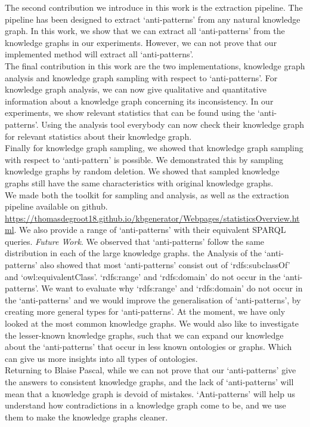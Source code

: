 \documentclass[11pt,letterpaper ,oneside ]{book}
\begin{document}
The second contribution we introduce in this work is the extraction pipeline. The pipeline has been designed to extract `anti-patterns' from any natural knowledge graph. In this work, we show that we can extract all `anti-patterns' from the knowledge graphs in our experiments. However, we can not prove that our implemented method will extract all `anti-patterns'.\\ 

The final contribution in this work are the two implementations, knowledge graph analysis and knowledge graph sampling with respect to `anti-patterns'. For knowledge graph analysis, we can now give qualitative and quantitative information about a knowledge graph concerning its inconsistency. In our experiments, we show relevant statistics that can be found using the `anti-patterns'. Using the analysis tool everybody can now check their knowledge graph for relevant statistics about their knowledge graph. \\

Finally for knowledge graph sampling, we showed that knowledge graph sampling with respect to `anti-pattern' is possible. We demonstrated this by sampling knowledge graphs by random deletion. We showed that sampled knowledge graphs still have the same characteristics with original knowledge graphs.\\

We made both the toolkit for sampling and analysis, as well as the extraction pipeline available on github. \\ \url{https://thomasdegroot18.github.io/kbgenerator/Webpages/statisticsOverview.html}. We also provide a range of `anti-patterns' with their equivalent SPARQL queries.
\textit{Future Work}. We observed that `anti-patterns' follow the same distribution in each of the large knowledge graphs. the Analysis of the `anti-patterns' also showed that most `anti-patterns' consist out of `rdfs:subclassOf' and `owl:equivalentClass'. `rdfs:range' and `rdfs:domain' do not occur in the `anti-patterns'.
We want to evaluate why `rdfs:range' and `rdfs:domain' do not occur in the `anti-patterns' and we would improve the generalisation of `anti-patterns', by creating more general types for `anti-patterns'. At the moment, we have only looked at the most common knowledge graphs. We would also like to investigate the lesser-known knowledge graphs, such that we can expand our knowledge about the `anti-patterns' that occur in less known ontologies or graphs. Which can give us more insights into all types of ontologies.\\

Returning to Blaise Pascal, while we can not prove that our `anti-patterns' give the answers to consistent knowledge graphs, and the lack of `anti-patterns' will mean that a knowledge graph is devoid of mistakes. `Anti-patterns' will help us understand how contradictions in a knowledge graph come to be, and we use them to make the knowledge graphs cleaner.

\newpage


\end{document}
